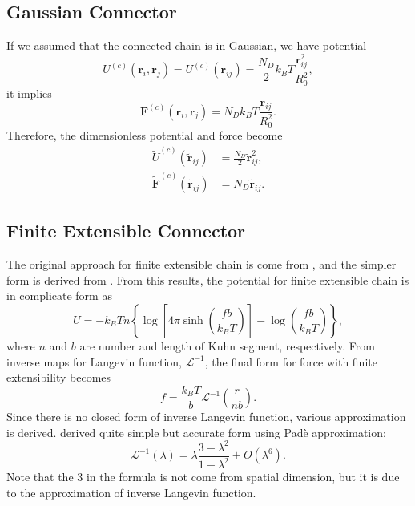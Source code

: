 \message{ !name(brief_Brownian_dynamics.tex)}\documentclass[10pt, a4paper]{report}
\begin{document}
\subsection{Gaussian Connector}
If we assumed that the connected chain is in Gaussian, we have potential 
\begin{equation}
U^{(c)}(\mathbf{r}_i, \mathbf{r}_j) = U^{(c)}(\mathbf{r}_{ij}) = \frac{N_D}{2}k_BT\frac{\mathbf{r}_{ij}^2}{R_0^2},
\end{equation}
it implies 
\begin{equation}
\mathbf{F}^{(c)}(\mathbf{r}_i, \mathbf{r}_j) = N_Dk_BT\frac{\mathbf{r}_{ij}}{R_0^2}.
\end{equation}
Therefore, the dimensionless potential and force become
\begin{align}
  \tilde{U}^{(c)}(\tilde{\mathbf{r}}_{ij}) &= \frac{N_D}{2}\tilde{\mathbf{r}}_{ij}^2,\\
  \tilde{\mathbf{F}}^{(c)}(\tilde{\mathbf{r}}_{ij}) &= N_D\tilde{\mathbf{r}}_{ij}.
\end{align}

\subsection{Finite Extensible Connector}
The original approach for finite extensible chain is come from \textcite{Kuhn1942}, and the simpler form is derived from \textcite{James1943}. From this results, the potential for finite extensible chain is in complicate form as \parencite{treloar1975physics}
\begin{equation}
U=-k_BTn\left\{\log\left[4\pi\sinh\left(\frac{fb}{k_BT}\right)\right]-\log\left(\frac{fb}{k_BT}\right)\right\},
\end{equation}
where $n$ and $b$ are number and length of Kuhn segment, respectively.
From inverse maps for Langevin function, $\mathscr{L}^{-1}$, the final form for force with finite extensibility becomes
\begin{equation}
  f = \frac{k_BT}{b}\mathscr{L}^{-1}\left(\frac{r}{nb}\right).
\end{equation}
Since there is no closed form of inverse Langevin function, various approximation is derived. \textcite{Cohen1991} derived quite simple but accurate form using Pad\`e approximation:
\begin{equation}
  \mathscr{L}^{-1}(\lambda) = \lambda\frac{3 - \lambda^2}{1-\lambda^2} + O(\lambda^6).
\end{equation}
Note that the $3$ in the formula is not come from spatial dimension, but it is due to the approximation of inverse Langevin function.
\end{document}

